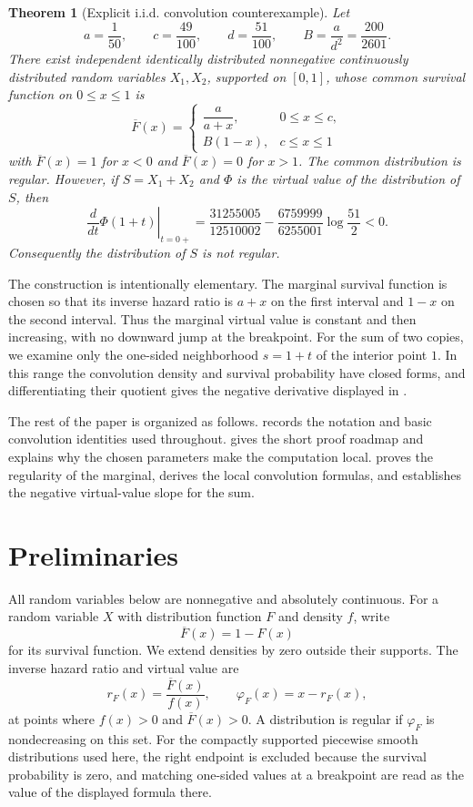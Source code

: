 \documentclass[11pt]{article}
\newtheorem{theorem}{Theorem}[section]
\begin{document}
\begin{theorem}[Explicit i.i.d. convolution counterexample]
\label{thm:main}
Let
\[
a=\frac1{50},\qquad c=\frac{49}{100},\qquad d=\frac{51}{100},
\qquad B=\frac{a}{d^2}=\frac{200}{2601}.
\]
There exist independent identically distributed nonnegative continuously
distributed random variables $X_1,X_2$, supported on $[0,1]$, whose common
survival function on $0\leq x\leq 1$ is
\[
\overline F(x)=
\begin{cases}
\dfrac{a}{a+x}, & 0 \leq x \leq c,\\[6pt]
B(1-x), & c \leq x \leq 1
\end{cases}
\]
with $\overline F(x)=1$ for $x<0$ and $\overline F(x)=0$ for $x>1$.
The common distribution is regular.  However, if $S=X_1+X_2$ and $\Phi$ is the
virtual value of the distribution of $S$, then
\[
\left.\frac{d}{dt}\Phi(1+t)\right|_{t=0+}
=
\frac{31255005}{12510002}
-\frac{6759999}{6255001}\log\frac{51}{2}
<0.
\]
Consequently the distribution of $S$ is not regular.
\end{theorem}

The construction is intentionally elementary.  The marginal survival function
is chosen so that its inverse hazard ratio is $a+x$ on the first interval and
$1-x$ on the second interval.  Thus the marginal virtual value is constant and
then increasing, with no downward jump at the breakpoint.  For the sum of two
copies, we examine only the one-sided neighborhood $s=1+t$ of the interior
point $1$.  In this range the convolution density and survival probability have
closed forms, and differentiating their quotient gives the negative derivative
displayed in .

The rest of the paper is organized as follows.  
records the notation and basic convolution identities used throughout.
 gives the short proof roadmap and explains why the chosen
parameters make the computation local.   proves the
regularity of the marginal, derives the local convolution formulas, and
establishes the negative virtual-value slope for the sum.

\section{Preliminaries}
\label{sec:preliminaries}

All random variables below are nonnegative and absolutely continuous.  For a
random variable $X$ with distribution function $F$ and density $f$, write
\[
\overline F(x)=1-F(x)
\]
for its survival function.  We extend densities by zero outside their supports.
The inverse hazard ratio and virtual value are
\begin{equation}
\label{eq:virtual-value}
r_F(x)=\frac{\overline F(x)}{f(x)},
\qquad
\varphi_F(x)=x-r_F(x),
\end{equation}
at points where $f(x)>0$ and $\overline F(x)>0$.  A distribution is regular if
$\varphi_F$ is nondecreasing on this set.  For the compactly supported
piecewise smooth distributions used here, the right endpoint is excluded
because the survival probability is zero, and matching one-sided values at a
breakpoint are read as the value of the displayed formula there.
\end{document}
